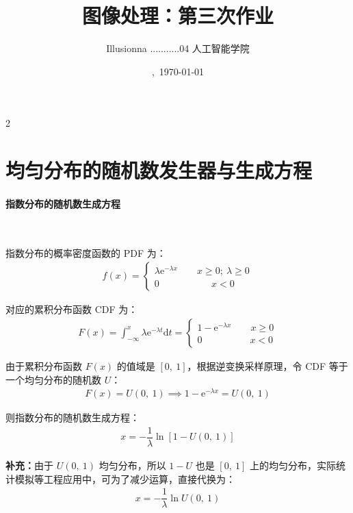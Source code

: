 \documentclass{article}
\title{图像处理：第三次作业}
\author{Illusionna \quad 2025...........04 \quad 人工智能学院}
\date{\currenttime,\ \today}
\newcommand{\e}{\mathrm{e}}
\renewcommand{\d}{\mathrm{d}}
\begin{document}
\maketitle
\vspace*{2em}
\begin{spacing}{2}
    \tableofcontents
\end{spacing}
\thispagestyle{empty}
\clearpage
\setcounter{page}{1}



\section{均匀分布的随机数发生器与生成方程}
\paragraph*{指数分布的随机数生成方程}~{}

指数分布的概率密度函数的 PDF 为：
\begin{align*}
    f(x)=\begin{cases}
        \lambda\e^{-\lambda x}\qquad x\geqslant0;\ \lambda\geqslant0
        \\[10pt]
        0\qquad\qquad\quad\ \ x<0
    \end{cases}
\end{align*}

对应的累积分布函数 CDF 为：
\begin{align*}
    F(x)=\int_{-\infty}^{x}\lambda\e^{-\lambda t}\d t=\begin{cases}
        1-\e^{-\lambda x}\qquad x\geqslant0
        \\[10pt]
        0\qquad\qquad\quad x<0
    \end{cases}
\end{align*}

由于累积分布函数 $F(x)$ 的值域是 $[0,\ 1]$，根据逆变换采样原理，令 CDF 等于一个均匀分布的随机数 $U$：
\begin{align*}
    F(x)=U(0,\ 1)\implies 1-\e^{-\lambda x}=U(0,\ 1)
\end{align*}

则指数分布的随机数生成方程：
\begin{align*}
    x=-\dfrac{1}{\lambda}\ln\left[1-U(0,\ 1)\right]
\end{align*}

\textbf{补充：}由于 $U(0,\ 1)$ 均匀分布，所以 $1-U$ 也是 $[0,\ 1]$ 上的均匀分布，实际统计模拟等工程应用中，可为了减少运算，直接代换为：
\begin{align*}
    x=-\dfrac{1}{\lambda}\ln U(0,\ 1)
\end{align*}
\end{document}
